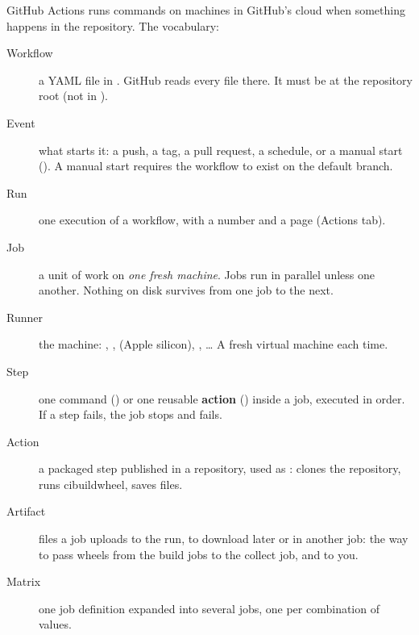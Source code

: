 \documentclass[11pt,a4paper]{article}
\begin{document}
GitHub Actions runs commands on machines in GitHub's cloud when something happens in the
repository. The vocabulary:
\begin{description}
  \item[Workflow] a YAML file in . GitHub reads every file there. It must be
        at the repository root (not in ).
  \item[Event] what starts it: a push, a tag, a pull request, a schedule, or a manual start
        (). A manual start requires the workflow to exist on the default
        branch.
  \item[Run] one execution of a workflow, with a number and a page (Actions tab).
  \item[Job] a unit of work on \emph{one fresh machine}. Jobs run in parallel unless one
         another. Nothing on disk survives from one job to the next.
  \item[Runner] the machine: , ,  (Apple
        silicon), , \dots{} A fresh virtual machine each time.
  \item[Step] one command () or one reusable \textbf{action} () inside a job,
        executed in order. If a step fails, the job stops and fails.
  \item[Action] a packaged step published in a repository, used as :
         clones the repository,  runs
        cibuildwheel,  saves files.
  \item[Artifact] files a job uploads to the run, to download later or in another job: the way to
        pass wheels from the build jobs to the collect job, and to you.
  \item[Matrix] one job definition expanded into several jobs, one per combination of values.
\end{description}
\end{document}
